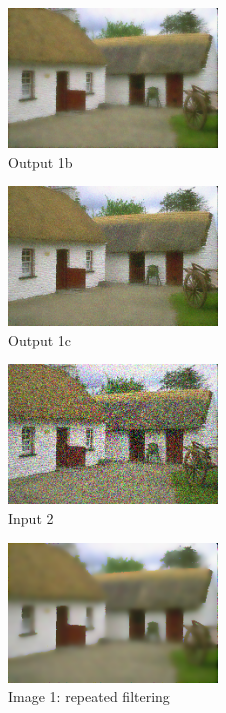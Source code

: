 \documentclass{article}
\begin{document}
\begin{figure}[!h]
  \centering
  \includegraphics[height=10em]{code/outputs/prob4_1_b.png}
  \caption{Output 1b}
\end{figure}

\begin{figure}[!h]
  \centering
  \includegraphics[height=10em]{code/outputs/prob4_1_c.png}
  \caption{Output 1c}
\end{figure}

\begin{figure}[!h]
  \centering
  \includegraphics[height=10em]{code/inputs/p4_nz2.png}
  \caption{Input 2}
\end{figure}

\begin{figure}[!h]
  \centering
  \includegraphics[height=10em]{code/outputs/prob4_1_rep.png}
  \caption{Image 1: repeated filtering}
\end{figure}
\end{document}
